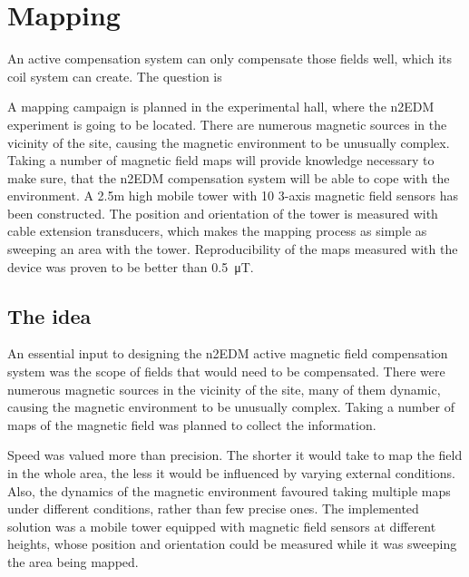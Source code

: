 \chapter{Mapping}
\label{ch:mapping}
An active compensation system can only compensate those fields well, which its coil system can create. The question is


A mapping campaign is planned in the experimental hall, where the n2EDM experiment is going to be located. There are numerous magnetic sources in the vicinity of the site, causing the magnetic environment to be unusually complex. Taking a number of magnetic field maps will provide knowledge necessary to make sure, that the n2EDM compensation system will be able to cope with the environment. A 2.5m high mobile tower with 10 3-axis magnetic field sensors has been constructed. The position and orientation of the tower is measured with cable extension transducers, which makes the mapping process as simple as sweeping an area with the tower. Reproducibility of the maps measured with the device was proven to be better than \SI{0.5}{\micro\tesla}.




\section{The idea}
An essential input to designing the n2EDM active magnetic field compensation system was the scope of fields that would need to be compensated. There were numerous magnetic sources in the vicinity of the  site, many of them dynamic, causing the magnetic environment to be unusually complex. Taking a number of maps of the magnetic field was planned to collect the information.

Speed was valued more than precision. The shorter it would take to map the field in the whole area, the less it would be influenced by varying external conditions. Also, the dynamics of the magnetic environment favoured taking multiple maps under different conditions, rather than few precise ones.
The implemented solution was a mobile tower equipped with magnetic field sensors at different heights, whose position and orientation could be measured while it was sweeping the area being mapped.

